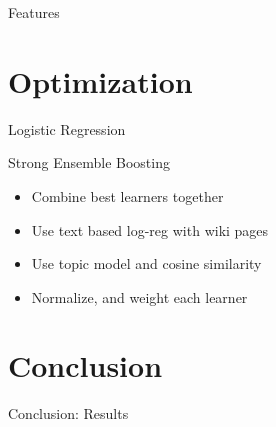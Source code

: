 \documentclass{beamer}
\begin{document}

\begin{frame}{Features}

\end{frame}


\section{Optimization}

\begin{frame}{Logistic Regression}

\end{frame}


\begin{frame}{Strong Ensemble Boosting}
   \begin{itemize}
      \item Combine best learners together
      \item Use text based log-reg with wiki pages
      \item Use topic model and cosine similarity
      \item Normalize, and weight each learner
   \end{itemize}
\end{frame}


\section{Conclusion}
\begin{frame}{Conclusion: Results}

\end{frame}
\end{document}
